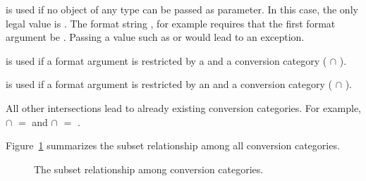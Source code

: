 \begin{description}
\item{} is used if no object of any type can be
    passed as parameter. In this case, the only legal value is .
    The format string , for example requires that the first
    format argument be .  Passing a value such as  or
     would lead to an exception.
\item{} is used if a format argument is restricted by a  and a  conversion category ( $\cap$ ).
\item{} is used if a format argument is restricted by an  and a  conversion category ( $\cap$ ).
\end{description}

\noindent All other intersections lead to already existing conversion categories.
For example,  $\cap$  $=$  and
 $\cap$  $=$ .

Figure~\ref{fig-formatter-cat} summarizes the subset
relationship among all conversion categories.

\begin{figure}[thbp]
    \caption{The subset relationship
        among conversion categories.}
    \label{fig-formatter-cat}
\end{figure}



%


